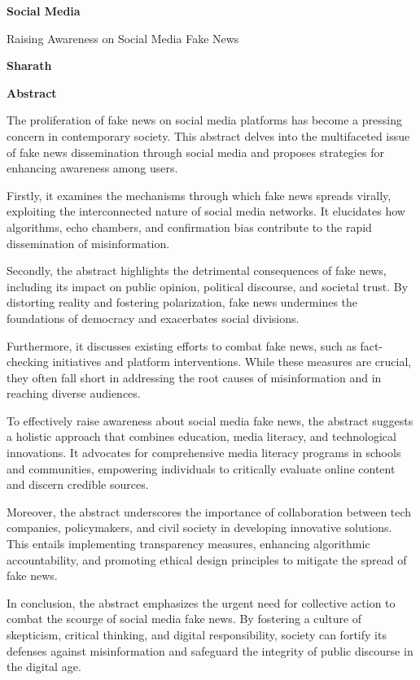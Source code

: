 \documentclass[10pt,a4paper]{article}
\begin{document}
	
	\thispagestyle{plain}
	
	
	\begin{center}
		
		\Large
		
		\textbf{Social Media}
		
		
		\vspace{0.4cm}
		
		\large
		
		Raising Awareness on Social Media Fake News
		
		
		\vspace{0.4cm}
		
		\textbf{Sharath}
		
		\vspace{0.9cm}
		
		\textbf{Abstract}
		
	\end{center}
	
	
	
	The proliferation of fake news on social media platforms has become a pressing concern in contemporary society. This abstract delves into the multifaceted issue of fake news dissemination through social media and proposes strategies for enhancing awareness among users.
	
	
	Firstly, it examines the mechanisms through which fake news spreads virally, exploiting the interconnected nature of social media networks. It elucidates how algorithms, echo chambers, and confirmation bias contribute to the rapid dissemination of misinformation.
	
	
	Secondly, the abstract highlights the detrimental consequences of fake news, including its impact on public opinion, political discourse, and societal trust. By distorting reality and fostering polarization, fake news undermines the foundations of democracy and exacerbates social divisions.
	
	
	Furthermore, it discusses existing efforts to combat fake news, such as fact-checking initiatives and platform interventions. While these measures are crucial, they often fall short in addressing the root causes of misinformation and in reaching diverse audiences.
	
	
	To effectively raise awareness about social media fake news, the abstract suggests a holistic approach that combines education, media literacy, and technological innovations. It advocates for comprehensive media literacy programs in schools and communities, empowering individuals to critically evaluate online content and discern credible sources.
	
	
	Moreover, the abstract underscores the importance of collaboration between tech companies, policymakers, and civil society in developing innovative solutions. This entails implementing transparency measures, enhancing algorithmic accountability, and promoting ethical design principles to mitigate the spread of fake news.
	
	In conclusion, the abstract emphasizes the urgent need for collective action to combat the scourge of social media fake news. By fostering a culture of skepticism, critical thinking, and digital responsibility, society can fortify its defenses against misinformation and safeguard the integrity of public discourse in the digital age.
\end{document}
